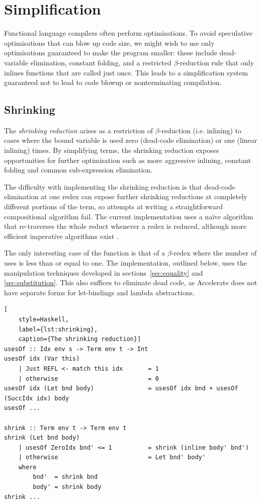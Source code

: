 

\section{Simplification}
\label{sec:simplification}

Functional language compilers often perform optimisations. To avoid speculative
optimisations that can blow up code size, we might wish to use only
optimisations guaranteed to make the program smaller: these include
dead-variable elimination, constant folding, and a restricted $\beta$-reduction
rule that only inlines functions that are called just once. This leads to a
simplification system guaranteed not to lead to code blowup or nonterminating
compilation.

\subsection{Shrinking}

The \emph{shrinking reduction} arises as a restriction of $\beta$-reduction
(i.e. inlining) to cases where the bound variable is used zero (dead-code
elimination) or one (linear inlining) times. By simplifying terms,
the shrinking reduction exposes opportunities for further optimisation such as
more aggressive inlining, constant folding and common sub-expression
elimination. %

The difficulty with implementing the shrinking reduction is that dead-code
elimination at one redex can expose further shrinking reductions at completely
different portions of the term, so attempts at writing a straightforward
compositional algorithm fail. The current implementation uses a na\"ive
algorithm that re-traverses the whole reduct whenever a redex is reduced,
although more efficient imperative algorithms exist
\cite{Appel:1997gs,Benton:2004ua,Kennedy:2007cb}.

The only interesting case of the  function is that of a
$\beta$-redex where the number of uses is less than or equal to one. The
implementation, outlined below, uses the  manipulation
techniques developed in sections~\ref{sec:equality} and \ref{sec:substitution}.
This also suffices to eliminate dead code, as Accelerate does not have separate
forms for let-bindings and lambda abstractions.
%
\begin{lstlisting}[
    style=Haskell,
    label={lst:shrinking},
    caption={The shrinking reduction}]
usesOf :: Idx env s -> Term env t -> Int
usesOf idx (Var this)
    | Just REFL <- match this idx       = 1
    | otherwise                         = 0
usesOf idx (Let bnd body)               = usesOf idx bnd + usesOf (SuccIdx idx) body
usesOf ...

shrink :: Term env t -> Term env t
shrink (Let bnd body)
    | usesOf ZeroIdx bnd' <= 1          = shrink (inline body' bnd')
    | otherwise                         = Let bnd' body'
    where
        bnd'  = shrink bnd
        body' = shrink body
shrink ...
\end{lstlisting}


